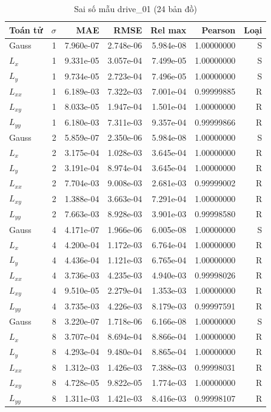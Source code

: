 \begin{table}[p]
\centering
\caption{Sai số mẫu drive\_01 (24 bản đồ)}
\begin{tabular}{lrrrrrr}
\toprule
Toán tử & $\sigma$ & MAE & RMSE & Rel max & Pearson & Loại\\
\midrule
Gauss & 1 & 7.960e-07 & 2.748e-06 & 5.984e-08 & 1.00000000 & S \\
$L_x$ & 1 & 9.331e-05 & 3.057e-04 & 7.499e-05 & 1.00000000 & S \\
$L_y$ & 1 & 9.734e-05 & 2.723e-04 & 7.496e-05 & 1.00000000 & S \\
$L_{xx}$ & 1 & 6.189e-03 & 7.322e-03 & 7.001e-04 & 0.99999885 & R \\
$L_{xy}$ & 1 & 8.033e-05 & 1.947e-04 & 1.501e-04 & 1.00000000 & R \\
$L_{yy}$ & 1 & 6.180e-03 & 7.311e-03 & 9.357e-04 & 0.99999866 & R \\
Gauss & 2 & 5.859e-07 & 2.350e-06 & 5.984e-08 & 1.00000000 & S \\
$L_x$ & 2 & 3.175e-04 & 1.028e-03 & 3.645e-04 & 1.00000000 & R \\
$L_y$ & 2 & 3.191e-04 & 8.974e-04 & 3.645e-04 & 1.00000000 & R \\
$L_{xx}$ & 2 & 7.704e-03 & 9.008e-03 & 2.681e-03 & 0.99999002 & R \\
$L_{xy}$ & 2 & 1.388e-04 & 3.663e-04 & 7.291e-04 & 1.00000000 & R \\
$L_{yy}$ & 2 & 7.663e-03 & 8.928e-03 & 3.901e-03 & 0.99998580 & R \\
Gauss & 4 & 4.171e-07 & 1.966e-06 & 6.005e-08 & 1.00000000 & S \\
$L_x$ & 4 & 4.200e-04 & 1.172e-03 & 6.764e-04 & 1.00000000 & R \\
$L_y$ & 4 & 4.436e-04 & 1.121e-03 & 6.765e-04 & 1.00000000 & R \\
$L_{xx}$ & 4 & 3.736e-03 & 4.235e-03 & 4.940e-03 & 0.99998026 & R \\
$L_{xy}$ & 4 & 9.510e-05 & 2.279e-04 & 1.353e-03 & 1.00000000 & R \\
$L_{yy}$ & 4 & 3.735e-03 & 4.226e-03 & 8.179e-03 & 0.99997591 & R \\
Gauss & 8 & 3.220e-07 & 1.718e-06 & 6.166e-08 & 1.00000000 & S \\
$L_x$ & 8 & 3.707e-04 & 8.694e-04 & 8.866e-04 & 1.00000000 & R \\
$L_y$ & 8 & 4.293e-04 & 9.480e-04 & 8.865e-04 & 1.00000000 & R \\
$L_{xx}$ & 8 & 1.312e-03 & 1.426e-03 & 7.388e-03 & 0.99998031 & R \\
$L_{xy}$ & 8 & 4.728e-05 & 9.822e-05 & 1.774e-03 & 1.00000000 & R \\
$L_{yy}$ & 8 & 1.311e-03 & 1.421e-03 & 8.416e-03 & 0.99998107 & R \\
\bottomrule
\end{tabular}
\end{table}

